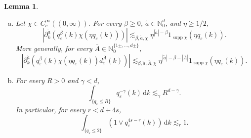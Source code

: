 \documentclass{article}
\numberwithin{equation}{section}
\newcommand{\mathd}{\mathrm{d}}
\theoremstyle{plain}
\newtheorem{lemma}[theorem]{Lemma}
\theoremstyle{definition}
\begin{document}
\begin{lemma}
\begin{enumerate}[(a)]
		\item Let \(\chi\in C_c^\infty((0,\infty))\). For every
		\(\beta\geqslant0\), \(\tilde a\in\mathbb N_0^d\), and
		\(\eta\geqslant1/2\),
		\begin{equation}
			\label{eq:q-epsilon-cutoff-derivatives}
			\left|
			\partial_k^{\tilde a}
			\left(
			q_\varepsilon^\beta(k)
			\chi(\eta q_\varepsilon(k))
			\right)
			\right|
			\lesssim_{\beta,\tilde a,\chi}
			\eta^{|\tilde a|-\beta}
			1_{\operatorname{supp}\chi}
			(\eta q_\varepsilon(k)).
		\end{equation}
		More generally, for every
		\(\bar A\in\mathbb N_0^{\{1\pm,\ldots,d\pm\}}\),
		\begin{equation}
			\label{eq:q-epsilon-cutoff-d-derivatives}
			\left|
			\partial_k^{\tilde a}
			\left(
			q_\varepsilon^\beta(k)
			\chi(\eta q_\varepsilon(k))
			d_\varepsilon^{\bar A}(k)
			\right)
			\right|
			\lesssim_{\beta,\tilde a,\bar A,\chi}
			\eta^{|\tilde a|-\beta-|\bar A|}
			1_{\operatorname{supp}\chi}
			(\eta q_\varepsilon(k)).
		\end{equation}
		
		\item For every \(R>0\) and \(\gamma<d\),
		\begin{equation}
			\label{eq:q-epsilon-volume-singular}
			\int_{\{q_\varepsilon\leqslant R\}}
			q_\varepsilon^{-\gamma}(k)\,\mathd k
			\lesssim_\gamma R^{d-\gamma}.
		\end{equation}
		In particular, for every \(r<d+4s\),
		\begin{equation}
			\label{eq:q-epsilon-check-integrability}
			\int_{\{q_\varepsilon\leqslant2\}}
			\left(
			1\vee q_\varepsilon^{4s-r}(k)
			\right)\,\mathd k
			\lesssim_r1.
		\end{equation}
	\end{enumerate}
\end{lemma}
\end{document}
